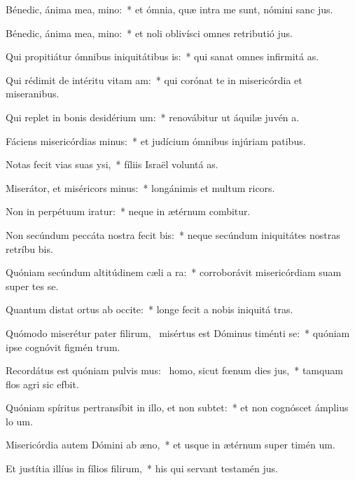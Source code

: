\item Bénedic, ánima mea, mino:~* et ómnia, quæ intra me sunt, nómini sanc jus.
\item Bénedic, ánima mea, mino:~* et noli oblivísci omnes retributió jus.
\item Qui propitiátur ómnibus iniquitátibus is:~* qui sanat omnes infirmitá as.
\item Qui rédimit de intéritu vitam am:~* qui corónat te in misericórdia et miseranibus.
\item Qui replet in bonis desidérium um:~* renovábitur ut áquilæ juvén a.
\item Fáciens misericórdias minus:~* et judícium ómnibus injúriam patibus.
\item Notas fecit vias suas ysi,~* fíliis Israël voluntá as.
\item Miserátor, et miséricors minus:~* longánimis et multum ricors.
\item Non in perpétuum iratur:~* neque in ætérnum combitur.
\item Non secúndum peccáta nostra fecit bis:~* neque secúndum iniquitátes nostras retríbu bis.
\item Quóniam secúndum altitúdinem cæli a ra:~* corroborávit misericórdiam suam super tes se.
\item Quantum distat ortus ab occite:~* longe fecit a nobis iniquitá tras.
\item Quómodo miserétur pater filirum,~\pscross{} misértus est Dóminus timénti se:~* quóniam ipse cognóvit figmén trum.
\item Recordátus est quóniam pulvis mus:~\pscross{} homo, sicut fœnum dies jus,~* tamquam flos agri sic efbit.
\item Quóniam spíritus pertransíbit in illo, et non subtet:~* et non cognóscet ámplius lo um.
\item Misericórdia autem Dómini ab æno,~* et usque in ætérnum super timén um.
\item Et justítia illíus in fílios filirum,~* his qui servant testamén jus.
